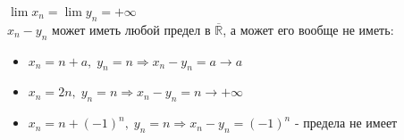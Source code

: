     $\lim x_n = \lim y_n = +\infty$ \\
    $x_n - y_n$  может иметь любой предел в $\overline{\mathbb{R}}$, а может его вообще не иметь:
    \begin{itemize}
        \item $x_n = n + a,\; y_n = n \Rightarrow x_n - y_n = a \to a$
        \item $x_n = 2n,\; y_n = n \Rightarrow x_n - y_n = n \to +\infty$
        \item $x_n = n + (-1)^n,\; y_n = n \Rightarrow x_n - y_n = (-1)^n$ - предела не имеет
    \end{itemize}